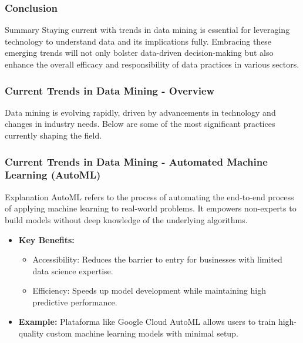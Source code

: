 \documentclass{beamer}
\begin{document}
\begin{frame}[fragile]
    \frametitle{Conclusion}
    \begin{block}{Summary}
        Staying current with trends in data mining is essential for leveraging technology to understand data and its implications fully. Embracing these emerging trends will not only bolster data-driven decision-making but also enhance the overall efficacy and responsibility of data practices in various sectors. 
    \end{block}
\end{frame}

\begin{frame}[fragile]
    \frametitle{Current Trends in Data Mining - Overview}
    Data mining is evolving rapidly, driven by advancements in technology and changes in industry needs. Below are some of the most significant practices currently shaping the field.
\end{frame}

\begin{frame}[fragile]
    \frametitle{Current Trends in Data Mining - Automated Machine Learning (AutoML)}
    \begin{block}{Explanation}
        AutoML refers to the process of automating the end-to-end process of applying machine learning to real-world problems. It empowers non-experts to build models without deep knowledge of the underlying algorithms.
    \end{block}
    
    \begin{itemize}
        \item \textbf{Key Benefits:}
        \begin{itemize}
            \item Accessibility: Reduces the barrier to entry for businesses with limited data science expertise.
            \item Efficiency: Speeds up model development while maintaining high predictive performance.
        \end{itemize}
        \item \textbf{Example:} 
        Plataforma like Google Cloud AutoML allows users to train high-quality custom machine learning models with minimal setup.
    \end{itemize}
\end{frame}
\end{document}
